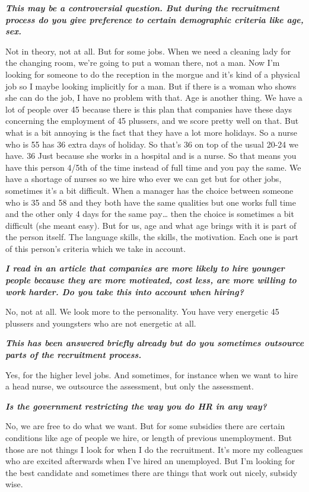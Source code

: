 \documentclass[a4paper,fleqn,11pt,dvips,titlepage]{article}
\newcommand{\question}[1]{\textbf{\textit{#1}}}
\numberwithin{figure}{section}
\numberwithin{equation}{section}
\begin{document}
\question{This may be a controversial question. But during the recruitment process do you give preference to certain demographic criteria like age, sex.}

Not in theory, not at all. But for some jobs. When we need a cleaning lady for the changing room, we’re going to put a woman there, not a man. Now I’m looking for someone to do the reception in the morgue and it’s kind of a physical job so I maybe looking implicitly for a man. But if there is a woman who shows she can do the job, I have no problem with that. Age is another thing. We have a lot of people over 45 because there is this plan that companies have these days concerning the employment of 45 plussers, and we score pretty well on that. But what is a bit annoying is the fact that they have a lot more holidays. So a nurse who is 55 has 36 extra days of holiday. So that’s 36 on top of the usual 20-24 we have. 36 Just because she works in a hospital and is a nurse. So that means you have this person 4/5th of the time instead of full time and you pay the same. We have a shortage of nurses so we hire who ever we can get but for other jobs, sometimes it’s a bit difficult. When a manager has the choice between someone who is 35 and 58 and they both have the same qualities but one works full time and the other only 4 days for the same pay… then the choice is sometimes a bit difficult (she meant easy). But for us, age and what age brings with it is part of the person itself. The language skills, the skills, the motivation. Each one is part of this person’s criteria which we take in account. 

\question{I read in an article that companies are more likely to hire younger people because they are more motivated, cost less, are more willing to work harder. Do you take this into account when hiring?}

No, not at all. We look more to the personality. You have very energetic 45 plussers and youngsters who are not energetic at all. 

\question{This has been answered briefly already but do you sometimes outsource parts of the recruitment process.}

Yes, for the higher level jobs. And sometimes, for instance when we want to hire a head nurse, we outsource the assessment, but only the assessment. 

\question{Is the government restricting the way you do HR in any way?}

No, we are free to do what we want. But for some subsidies there are certain conditions like age of people we hire, or length of previous unemployment. But those are not things I look for when I do the recruitment. It’s more my colleagues who are excited afterwards when I’ve hired an unemployed. But I’m looking for the best candidate and sometimes there are things that work out nicely, subsidy wise. 
\end{document}

